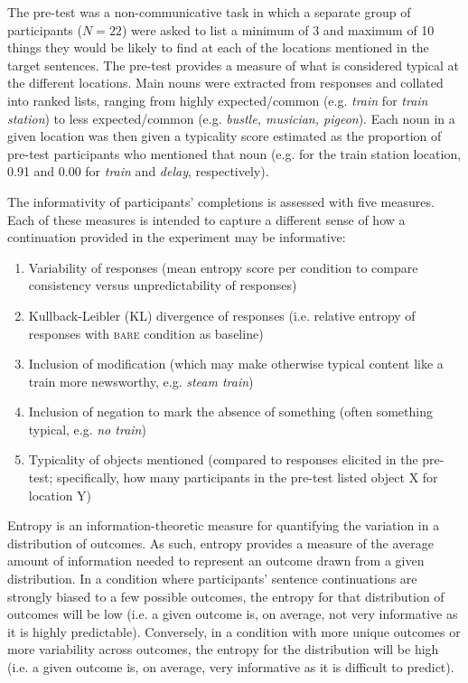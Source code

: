 \documentclass[output=paper,colorlinks,citecolor=brown]{langscibook}
\begin{document}
The pre-test was a non-communicative task in which a separate group of participants ($N=22$) were asked to list a minimum of 3 and maximum of 10 things they would be likely to find at each of the locations mentioned in the target sentences. The pre-test provides a measure of what is considered typical at the different locations. Main nouns were extracted from responses and collated into ranked lists, ranging from highly expected\slash common (e.g. \textit{train} for \textit{train station}) to less expected\slash common (e.g. \textit{bustle, musician, pigeon}). Each noun in a given location was then given a typicality score estimated as the proportion of pre-test participants who mentioned that noun (e.g. for the train station location, 0.91 and 0.00 for \textit{train} and \textit{delay}, respectively).
 
The informativity of participants’ completions is assessed with five measures. Each of these measures is intended to capture a different sense of how a continuation provided in the experiment may be informative: 
\begin{enumerate}
\item Variability of responses (mean entropy score per condition to compare consistency versus unpredictability of responses)
\item Kullback-Leibler (KL) divergence of responses (i.e. relative entropy of responses with \textsc{bare} condition as baseline)
\item Inclusion of modification (which may make otherwise typical content like a train more newsworthy, e.g. \textit{steam train})
\item Inclusion of negation to mark the absence of something (often something typical, e.g. \textit{no train})
\item Typicality of objects mentioned (compared to responses elicited in the pre-test; specifically, how many participants in the pre-test listed object X for location Y)
\end{enumerate}

Entropy is an information-theoretic measure for quantifying the variation in a distribution of outcomes. As such, entropy provides a measure of the average amount of information needed to represent an outcome drawn from a given distribution. In a condition where participants' sentence continuations are strongly biased to a few possible outcomes, the entropy for that distribution of outcomes will be low (i.e. a given outcome is, on average, not very informative as it is highly predictable). Conversely, in a condition with more unique outcomes or more variability across outcomes, the entropy for the distribution will be high (i.e. a given outcome is, on average, very informative as it is difficult to predict).
\end{document}
